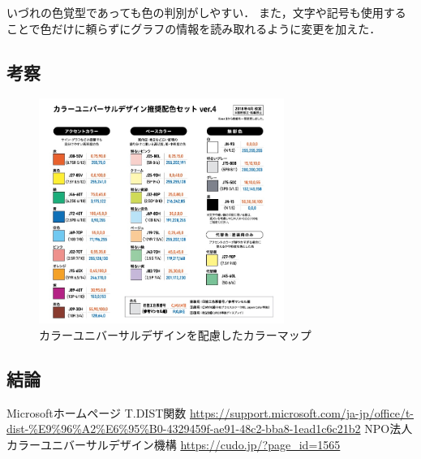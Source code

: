\documentclass[titlepage]{jlreq}
\begin{document}
いづれの色覚型であっても色の判別がしやすい．
また，文字や記号も使用することで色だけに頼らずにグラフの情報を読み取れるように変更を加えた．


\subsection{考察}
\begin{figure}
    \includegraphics[width=8cm]{color_palet.jpg}
    \centering
    \caption{カラーユニバーサルデザインを配慮したカラーマップ}
\end{figure}

\subsection{結論}

\begin{thebibliography}{99}
     Microsoftホームページ T.DIST関数 \url{https://support.microsoft.com/ja-jp/office/t-dist-%E9%96%A2%E6%95%B0-4329459f-ae91-48c2-bba8-1ead1c6c21b2}
     NPO法人カラーユニバーサルデザイン機構 \url{https://cudo.jp/?page_id=1565}
\end{thebibliography}
\end{document}
